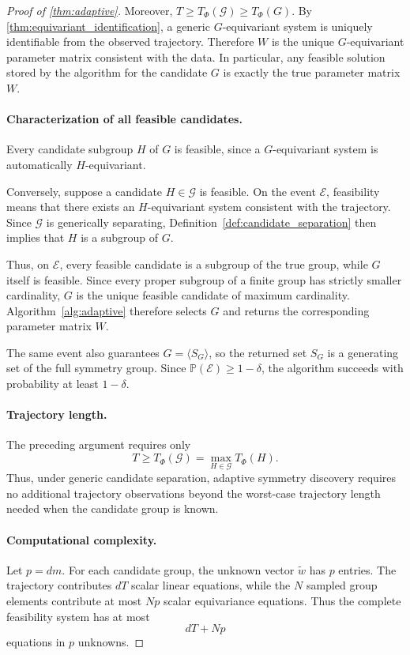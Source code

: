 \documentclass[11pt]{article}
\theoremstyle{plain}
\theoremstyle{definition}
\theoremstyle{remark}
\begin{document}
\begin{proof}[Proof of \cref{thm:adaptive}]
Moreover, \(T\ge T_\Phi(\mathcal G)\ge T_\Phi(G)\). By
\cref{thm:equivariant_identification}, a generic \(G\)-equivariant system is
uniquely identifiable from the observed trajectory. Therefore \(W\) is the
unique \(G\)-equivariant parameter matrix consistent with the data. In
particular, any feasible solution stored by the algorithm for the candidate
\(G\) is exactly the true parameter matrix \(W\).

\paragraph{Characterization of all feasible candidates.}
Every candidate subgroup \(H\) of \(G\) is feasible, since a
\(G\)-equivariant system is automatically \(H\)-equivariant.

Conversely, suppose a candidate \(H\in\mathcal G\) is feasible. On the event
\(\mathcal E\), feasibility means that there exists an \(H\)-equivariant
system consistent with the trajectory. Since \(\mathcal G\) is generically
separating, Definition~\ref{def:candidate_separation} then implies that \(H\) is a
subgroup of \(G\).

Thus, on \(\mathcal E\), every feasible candidate is a subgroup of the true
group, while \(G\) itself is feasible. Since every proper subgroup of a finite
group has strictly smaller cardinality, \(G\) is the unique feasible candidate
of maximum cardinality. Algorithm~\ref{alg:adaptive} therefore selects \(G\)
and returns the corresponding parameter matrix \(W\).

The same event also guarantees
\(G=\langle S_G\rangle\), so the returned set \(S_G\) is a generating set of
the full symmetry group. Since \(\mathbb P(\mathcal E)\ge1-\delta\), the
algorithm succeeds with probability at least \(1-\delta\).

\paragraph{Trajectory length.}
The preceding argument requires only
\[
T\ge
T_\Phi(\mathcal G)
=
\max_{H\in\mathcal G}T_\Phi(H).
\]
Thus, under generic candidate separation, adaptive symmetry discovery requires
no additional trajectory observations beyond the worst-case trajectory length
needed when the candidate group is known.

\paragraph{Computational complexity.}
Let \(p=dm\). For each candidate group, the unknown vector
\(\widetilde w\) has \(p\) entries. The trajectory contributes \(dT\) scalar
linear equations, while the \(N\) sampled group elements contribute at most
\(Np\) scalar equivariance equations. Thus the complete feasibility system has
at most
\[
dT+Np
\]
equations in \(p\) unknowns.


\end{proof}
\end{document}
